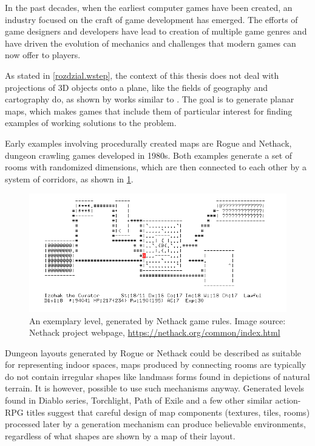 \documentclass[12pt]{report}
\begin{document}
In the past decades, when the earliest computer games have been created, an industry focused on the craft of game development has emerged. The efforts of game designers and developers have lead to creation of multiple game genres and have driven the evolution of mechanics and challenges that modern games can now offer to players.

As stated in \cref{rozdzial.wstep}, the context of this thesis does not deal with projections of 3D objects onto a plane, like the fields of geography and cartography do, as shown by works similar to \autocite{snyder1993flattening}. The goal is to generate planar maps, which makes games that include them of particular interest for finding examples of working solutions to the problem. 

Early examples involving procedurally created maps are Rogue and Nethack, dungeon crawling games developed in 1980s. Both examples generate a set of rooms with randomized dimensions, which are then connected to each other by a system of corridors, as shown in \cref{fig:nethack}.
 

\begin{figure}[h]
	\centering
	\includegraphics[width=0.7\linewidth]{images/nethack}
	\caption{An exemplary level, generated by Nethack game rules. Image source: Nethack project webpage, \url{https://nethack.org/common/index.html}}
	\label{fig:nethack}
\end{figure}

Dungeon layouts generated by Rogue or Nethack could be described as suitable for representing indoor spaces, maps produced by connecting rooms are typically do not contain irregular shapes like landmass forms found in depictions of natural terrain. It is however, possible to use such mechanisms anyway. Generated levels found in Diablo series, Torchlight, Path of Exile and a few other similar action-RPG titles suggest that careful design of map components (textures, tiles, rooms) processed later by a generation mechanism can produce believable environments, regardless of what shapes are shown by a map of their layout. 
	
\end{document}
